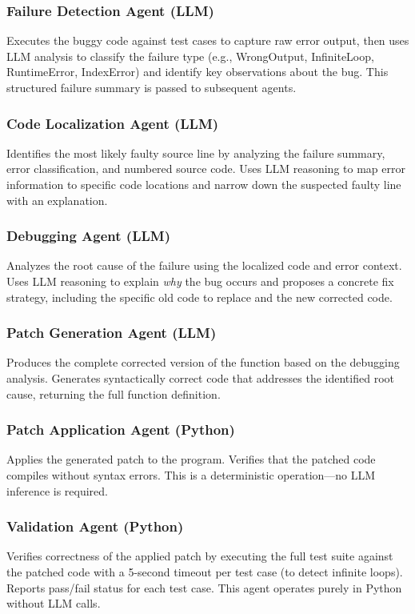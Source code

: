 \documentclass[conference]{IEEEtran}
\begin{document}
\subsubsection{Failure Detection Agent (LLM)}
Executes the buggy code against test cases to capture raw error output, then uses LLM analysis to classify the failure type (e.g., WrongOutput, InfiniteLoop, RuntimeError, IndexError) and identify key observations about the bug. This structured failure summary is passed to subsequent agents.

\subsubsection{Code Localization Agent (LLM)}
Identifies the most likely faulty source line by analyzing the failure summary, error classification, and numbered source code. Uses LLM reasoning to map error information to specific code locations and narrow down the suspected faulty line with an explanation.

\subsubsection{Debugging Agent (LLM)}
Analyzes the root cause of the failure using the localized code and error context. Uses LLM reasoning to explain \textit{why} the bug occurs and proposes a concrete fix strategy, including the specific old code to replace and the new corrected code.

\subsubsection{Patch Generation Agent (LLM)}
Produces the complete corrected version of the function based on the debugging analysis. Generates syntactically correct code that addresses the identified root cause, returning the full function definition.

\subsubsection{Patch Application Agent (Python)}
Applies the generated patch to the program. Verifies that the patched code compiles without syntax errors. This is a deterministic operation---no LLM inference is required.

\subsubsection{Validation Agent (Python)}
Verifies correctness of the applied patch by executing the full test suite against the patched code with a 5-second timeout per test case (to detect infinite loops). Reports pass/fail status for each test case. This agent operates purely in Python without LLM calls.
\end{document}
